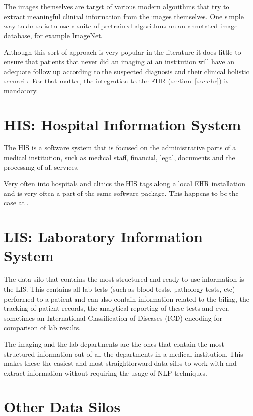 The images themselves are target of various modern algorithms that try to extract meaningful clinical information from the images themselves. One simple way to do so is to use a suite of pretrained algorithms on an annotated image database, for example ImageNet\cite{deng2009}.

Although this sort of approach is very popular in the literature it does little to ensure that patients that never did an imaging at an institution will have an adequate follow up according to the suspected diagnosis and their clinical holistic scenario. For that matter, the integration to the EHR (section~\ref{sec:ehr}) is mandatory.

\section{HIS\@: Hospital Information System}

The HIS is a software system that is focused on the administrative parts of a medical institution, such as medical staff, financial, legal, documents and the processing of all services. 

Very often into hospitals and clinics the HIS tags along a local EHR installation and is very often a part of the same software package. This happens to be the case at \nomeHsl{}.

\section{LIS\@: Laboratory Information System}

The data silo that contains the most structured and ready-to-use information is the LIS\@. This contains all lab tests (such as blood tests, pathology tests, etc) performed to a patient and can also contain information related to the biling, the tracking of patient records, the analytical reporting of these tests and even sometimes an International Classification of Diseases (ICD) encoding for comparison of lab results.

The imaging and the lab departments are the ones that contain the most structured information out of all the departments in a medical institution. This makes these the easiest and most straightforward data silos to work with and extract information without requiring the usage of NLP techniques.

\section{Other Data Silos}

